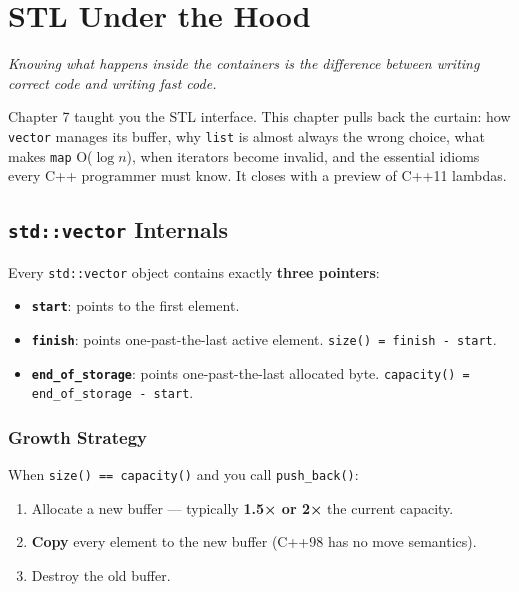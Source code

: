 \chapter{STL Under the Hood}
\label{ch:stl-under-the-hood}

\textit{Knowing what happens inside the containers is the difference between writing correct code and writing fast code.}

Chapter 7 taught you the STL interface. This chapter pulls back the curtain: how \texttt{vector} manages its buffer, why \texttt{list} is almost always the wrong choice, what makes \texttt{map} O(\(\log n\)), when iterators become invalid, and the essential idioms every C++ programmer must know. It closes with a preview of C++11 lambdas.

\section{\texttt{std::vector} Internals}
\label{sec:vector-internals}

Every \texttt{std::vector} object contains exactly \textbf{three pointers}:

\begin{itemize}
    \item \textbf{\texttt{start}}: points to the first element.
    \item \textbf{\texttt{finish}}: points one-past-the-last active element. \texttt{size() = finish - start}.
    \item \textbf{\texttt{end\_of\_storage}}: points one-past-the-last allocated byte. \texttt{capacity() = end\_of\_storage - start}.
\end{itemize}

\subsection{Growth Strategy}

When \texttt{size() == capacity()} and you call \texttt{push\_back()}:

\begin{enumerate}
    \item Allocate a new buffer --- typically \textbf{1.5× or 2×} the current capacity.
    \item \textbf{Copy} every element to the new buffer (C++98 has no move semantics).
    \item Destroy the old buffer.
\end{enumerate}

